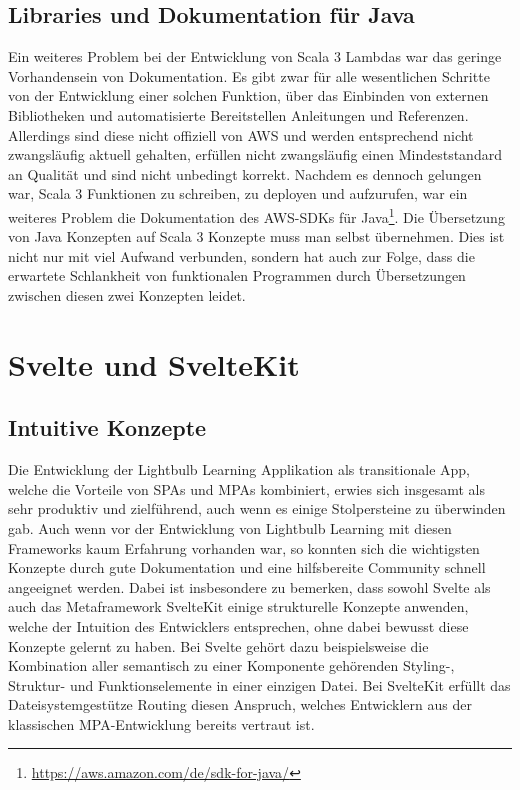 \subsection{Libraries und Dokumentation für Java}
Ein weiteres Problem bei der Entwicklung von Scala 3 Lambdas war das geringe Vorhandensein von Dokumentation. Es gibt zwar für alle wesentlichen Schritte von der Entwicklung einer solchen Funktion, über das Einbinden von externen Bibliotheken und automatisierte Bereitstellen Anleitungen und Referenzen. Allerdings sind diese nicht offiziell von AWS und werden entsprechend nicht zwangsläufig aktuell gehalten, erfüllen nicht zwangsläufig einen Mindeststandard an Qualität und sind nicht unbedingt korrekt. Nachdem es dennoch gelungen war, Scala 3 Funktionen zu schreiben, zu deployen und aufzurufen, war ein weiteres Problem die Dokumentation des AWS-SDKs für Java\footnote{\url{https://aws.amazon.com/de/sdk-for-java/}}. Die Übersetzung von Java Konzepten auf Scala 3 Konzepte muss man selbst übernehmen. Dies ist nicht nur mit viel Aufwand verbunden, sondern hat auch zur Folge, dass die erwartete Schlankheit von funktionalen Programmen durch Übersetzungen zwischen diesen zwei Konzepten leidet.
\section{Svelte und SvelteKit}
\subsection{Intuitive Konzepte}
Die Entwicklung der Lightbulb Learning Applikation als transitionale App, welche die Vorteile von SPAs und MPAs kombiniert, erwies sich insgesamt als sehr produktiv und zielführend, auch wenn es einige Stolpersteine zu überwinden gab. Auch wenn vor der Entwicklung von Lightbulb Learning mit diesen Frameworks kaum Erfahrung vorhanden war, so konnten sich die wichtigsten Konzepte durch gute Dokumentation und eine hilfsbereite Community schnell angeeignet werden. Dabei ist insbesondere zu bemerken, dass sowohl Svelte als auch das Metaframework SvelteKit einige strukturelle Konzepte anwenden, welche der Intuition des Entwicklers entsprechen, ohne dabei bewusst diese Konzepte gelernt zu haben. Bei Svelte gehört dazu beispielsweise die Kombination aller semantisch zu einer Komponente gehörenden Styling-, Struktur- und Funktionselemente in einer einzigen Datei. Bei SvelteKit erfüllt das Dateisystemgestütze Routing diesen Anspruch, welches Entwicklern aus der klassischen MPA-Entwicklung bereits vertraut ist.
